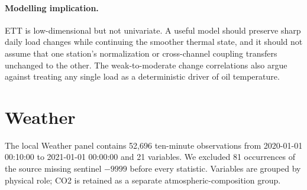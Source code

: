 \documentclass[10pt]{article}
\begin{document}
\paragraph{Modelling implication.}
ETT is low-dimensional but not univariate. A useful model should preserve sharp daily load changes while continuing the smoother thermal state, and it should not assume that one station's normalization or cross-channel coupling transfers unchanged to the other. The weak-to-moderate change correlations also argue against treating any single load as a deterministic driver of oil temperature.


\section{Weather}

The local Weather panel contains 52,696 ten-minute observations from 2020-01-01 00:10:00 to 2021-01-01 00:00:00 and 21 variables. We excluded 81 occurrences of the source missing sentinel $-9999$ before every statistic. Variables are grouped by physical role; CO2 is retained as a separate atmospheric-composition group.
\end{document}
